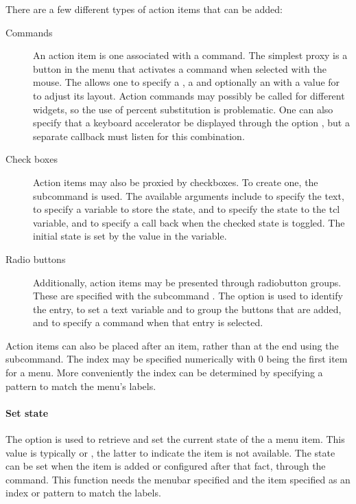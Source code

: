 There are a few different types of action items that can be added:
 
\begin{description}
\item[Commands] An action item is one associated with a command. The
  simplest proxy is a button in the menu that activates a command when
  selected with the mouse. The  allows
  one to specify a , a  and optionally an
   with a value for  to adjust its
  layout. Action commands may %
  possibly be called for different widgets, so the use of percent
  substitution is problematic. One can also specify that a keyboard
  accelerator be displayed through the option , but
  a separate callback must listen for this combination.

\item[Check boxes] Action items may also be proxied by checkboxes. To
  create one, the subcommand  is
  used. The available arguments include  to specify the
  text,  to specify a \TCL{} variable to store the state,
   and  to specify the state to the tcl
  variable, and  to specify a call back when the checked
  state is toggled. The initial state is set by the value in the
  \TCL\/ variable.

\item[Radio buttons] Additionally, action items may be presented
  through radiobutton groups. These are specified with the subcommand
  . The  option is
  used to identify the entry,  to set a text variable
  and to group the buttons that are added, and  to
  specify a command when that entry is selected.
\end{description}

Action items can also be placed after an item, rather than at the end
using the  subcommand. The
index may be specified numerically with 0 being the first item for a
menu.  More conveniently the index can be determined by specifying a
pattern to match the menu's labels.


\paragraph{Set state}
The  option is used to retrieve and set the current state
of the a menu item.  This value is typically  or
, the latter to indicate the item is not available. The
state can be set when the item is added or configured after that fact,
through the  command. This function
needs the menubar specified and the item specified as an index or
pattern to match the labels.

